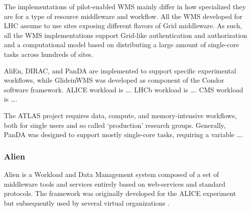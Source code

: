 The implementations of pilot-enabled WMS mainly differ in how specialized they
are for a type of resource middleware and workflow. All the WMS developed for
LHC assume to use sites exposing different flavors of Grid middleware. As such,
all the WMS implementations support Grid-like authentication and authorization
and a computational model based on distributing a large amount of single-core
tasks across hundreds of sites.


AliEn, DIRAC, and PanDA are implemented to support specific experimental
workflows, while GlideinWMS was developed as component of the Condor software
framework. ALICE workload is \ldots. LHCb workload is \ldots. CMS workload is
\ldots.

The ATLAS project requires data, compute, and memory-intensive workflows, both
for single users and so called `production' research groups. Generally, PanDA
was designed to support mostly single-core tasks, requiring a variable \ldots.



\subsubsection{Alien}

Alien is a Workload and Data Management system composed of a set of middleware
tools and services entirely based on web-services and standard protocols. The
framework was originally developed for the ALICE experiment~\cite{Alice1995} but
subsequently used by several virtual organizations
\cite{McClatechey2003,GPCALMA}.


